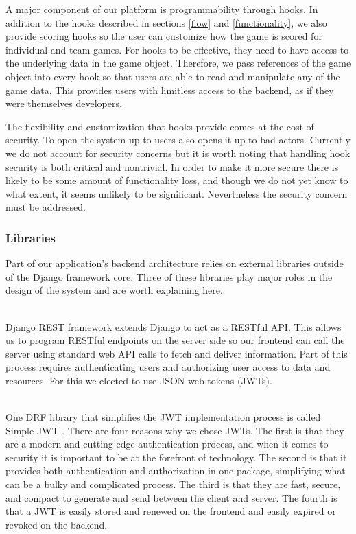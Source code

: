 \documentclass{article}
\begin{document}
            A major component of our platform is programmability through hooks. In addition to the hooks described in sections \ref{flow} and \ref{functionality}, we also provide scoring hooks so the user can customize how the game is scored for individual and team games. For hooks to be effective, they need to have access to the underlying data in the game object. Therefore, we pass references of the game object into every hook so that users are able to read and manipulate any of the game data. This provides users with limitless access to the backend, as if they were themselves developers.
            \smallskip
            
            The flexibility and customization that hooks provide comes at the cost of security. To open the system up to users also opens it up to bad actors. Currently we do not account for security concerns but it is worth noting that handling hook security is both critical and nontrivial. In order to make it more secure there is likely to be some amount of functionality loss, and though we do not yet know to what extent, it seems unlikely to be significant. Nevertheless the security concern must be addressed.
	    
		\subsubsection{Libraries}
		    Part of our application's backend architecture relies on external libraries outside of the Django framework core. Three of these libraries play major roles in the design of the system and are worth explaining here.
            \\\\
		    \smallskip

    	    Django REST framework extends Django to act as a RESTful API. This allows us to program RESTful endpoints on the server side so our frontend can call the server using standard web API calls to fetch and deliver information. Part of this process requires authenticating users and authorizing user access to data and resources. For this we elected to use JSON web tokens (JWTs).
            \\\\
    	    \smallskip

    	    One DRF library that simplifies the JWT implementation process is called Simple JWT \cite{simplejwt}. There are four reasons why we chose JWTs. The first is that they are a modern and cutting edge authentication process, and when it comes to security it is important to be at the forefront of technology. The second is that it provides both authentication and authorization in one package, simplifying what can be a bulky and complicated process. The third is that they are fast, secure, and compact to generate and send between the client and server. The fourth is that a JWT is easily stored and renewed on the frontend and easily expired or revoked on the backend.
            \\\\
    	    \smallskip
	    
\end{document}
